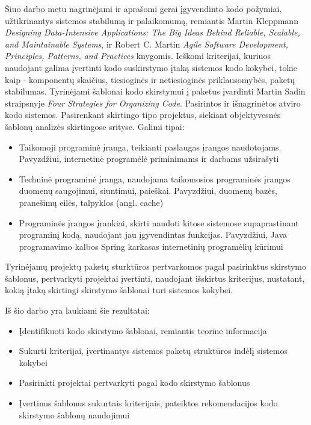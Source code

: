 Šiuo darbo metu nagrinėjami ir aprašomi gerai įgyvendinto kodo požymiai, užtikrinantys
sistemos stabilumą ir palaikomumą, remiantis Martin Kleppmann \textit{Designing Data-Intensive Applications: The Big Ideas Behind Reliable, Scalable, and Maintainable Systems},
ir Robert C. Martin \textit{Agile Software Development, Principles, Patterns, and Practices} knygomis.
Ieškomi kriterijai, kuriuos naudojant galima įvertinti kodo suskirstymo įtaką sistemos kodo kokybei, tokie kaip - komponentų skaičius, tiesioginės ir netiesioginės priklausomybės, paketų stabilumas\cite{AgileSoftwareDevelopment}.
Tyrinėjami šablonai kodo skirstymui į paketus įvardinti Martin Sadin straipsnyje \textit{Four Strategies for Organizing Code}.
Pasirintos ir išnagrinėtos atviro kodo sistemos.
Pasirenkant skirtingo tipo projektus, siekiant
objektyvesnės šablonų analizės skirtingose srityse.
Galimi tipai:
    \begin{itemize}
        \item Taikomoji programinė įranga, teikianti paslaugas įrangos naudotojams. Pavyzdžiui,
internetinė programėlė priminimams ir darbams užsirašyti
        \item Techninė programinė įranga, naudojama taikomosios programinės įrangos duomenų
saugojimui, siuntimui, paieškai. Pavyzdžiui, duomenų bazės, pranešimų eilės, talpyklos
(angl. cache)
        \item Programinės įrangos įrankiai, skirti naudoti kitose sistemose supaprastinant programinį
kodą, naudojant jau įgyvendintas funkcijas. Pavyzdžiui, Java programavimo kalbos
Spring karkasas internetinių programėlių kūrimui
    \end{itemize}
Tyrinėjamų projektų paketų sturktūros pertvarkomos pagal pasirinktus skirstymo šablonus, pertvarkyti projektai įvertinti, naudojant išskirtus kriterijus, nustatant, kokią įtaką
skirtingi skirstymo šablonai turi sistemos kokybei.

Iš šio darbo yra laukiami šie rezultatai:
\begin{itemize}
    \item Įdentifikuoti kodo skirstymo šablonai, remiantis teorine informacija
    \item Sukurti kriterijai, įvertinantys sistemos paketų struktūros indėlį sistemos kokybei
    \item Pasirinkti projektai pertvarkyti pagal kodo skirstymo šablonus
    \item Įvertinus šablonus sukurtais kriterijais, pateiktos rekomendacijos kodo skirstymo šablonų naudojimui
\end{itemize}

